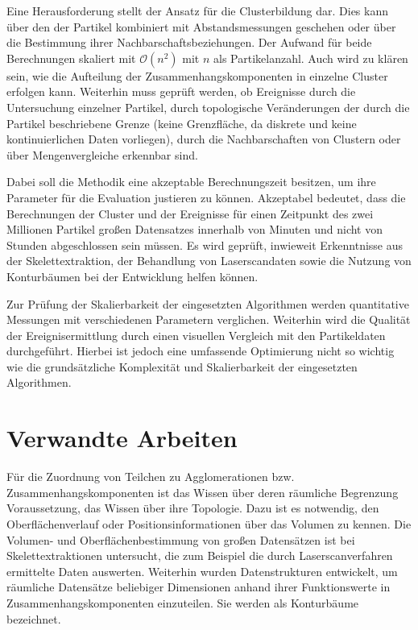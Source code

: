 Eine Herausforderung stellt der Ansatz für die Clusterbildung dar. Dies kann über den  der Partikel kombiniert mit Abstandsmessungen geschehen oder über die Bestimmung ihrer Nachbarschaftsbeziehungen. Der Aufwand für beide Berechnungen skaliert mit $\mathcal{O}(n^2)$ mit $n$ als Partikelanzahl. %
Auch wird zu klären sein, wie die Aufteilung der Zusammenhangskomponenten in einzelne Cluster erfolgen kann. %
Weiterhin muss geprüft werden, ob Ereignisse durch die Untersuchung einzelner Partikel, durch topologische Veränderungen der durch die Partikel beschriebene Grenze (keine Grenzfläche, da diskrete und keine kontinuierlichen Daten vorliegen), durch die Nachbarschaften von Clustern oder über Mengenvergleiche erkennbar sind.

Dabei soll die Methodik eine akzeptable Berechnungszeit besitzen, um ihre Parameter für die Evaluation justieren zu können. Akzeptabel bedeutet, dass die Berechnungen der Cluster und der Ereignisse für einen Zeitpunkt des zwei Millionen Partikel großen Datensatzes innerhalb von Minuten und nicht von Stunden abgeschlossen sein müssen. Es wird geprüft, inwieweit Erkenntnisse aus der Skelettextraktion, der Behandlung von Laserscandaten sowie die Nutzung von Konturbäumen bei der Entwicklung helfen können.

Zur Prüfung der Skalierbarkeit der eingesetzten Algorithmen werden quantitative Messungen mit verschiedenen Parametern verglichen. Weiterhin wird die Qualität der Ereignisermittlung durch einen visuellen Vergleich mit den Partikeldaten durchgeführt.
Hierbei ist jedoch eine umfassende Optimierung nicht so wichtig wie die grundsätzliche Komplexität und Skalierbarkeit der eingesetzten Algorithmen.

\chapter{Verwandte Arbeiten}
Für die Zuordnung von Teilchen zu Agglomerationen bzw. Zusammenhangskomponenten ist das Wissen über deren räumliche Begrenzung Voraussetzung, das Wissen über ihre Topologie. Dazu ist es notwendig, den Oberflächenverlauf oder Positionsinformationen über das Volumen zu kennen. Die Volumen- und Oberflächenbestimmung von großen Datensätzen ist bei Skelettextraktionen untersucht, die zum Beispiel die durch Laserscanverfahren ermittelte Daten auswerten. Weiterhin wurden Datenstrukturen entwickelt, um räumliche Datensätze beliebiger Dimensionen anhand ihrer Funktionswerte in Zusammenhangskomponenten einzuteilen. Sie werden als Konturbäume bezeichnet.

